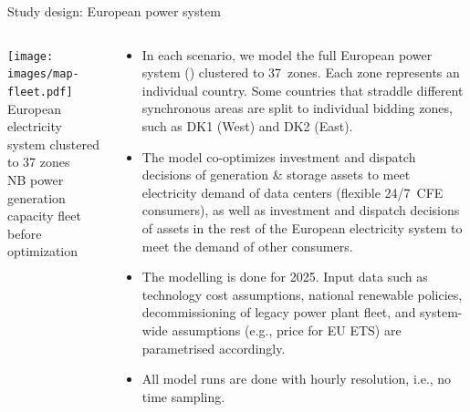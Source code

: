 \begin{frame}{Study design: European power system}
  
  {\footnotesize
  \begin{columns}[T]

  \begin{column}{7cm}
  \centering

  \vspace{0.6cm}
  \texttt{[image: images/map-fleet.pdf]}
  {\scriptsize European electricity system clustered to 37 zones \\ 
  NB power generation capacity fleet before optimization}
  \end{column}

  \begin{column}{8cm}
  \begin{itemize}
  \vspace{-0.2cm}
  \item In each scenario, we model the full European power system () 
  clustered to \alert{37~zones}. Each zone represents an individual country. Some countries
  that straddle different synchronous areas are split to individual bidding zones, 
  such as DK1 (West) and DK2 (East).

  \item The model \alert{co-optimizes} investment and dispatch decisions of generation \& storage assets to meet electricity demand of data centers (flexible 24/7~CFE consumers), as well as investment and dispatch decisions of assets in the rest of the European electricity system to meet the demand of other consumers. 
  
  \item The modelling is done for \alert{2025}. Input data such as technology cost assumptions,
  national renewable policies, decommissioning of legacy power plant fleet, and system-wide assumptions (e.g., price for EU ETS) are parametrised accordingly.

  \item All model runs are done with \alert{hourly resolution}, i.e., no time sampling.
  
  \end{itemize}

  \end{column}
  \end{columns}
  }

\end{frame}



